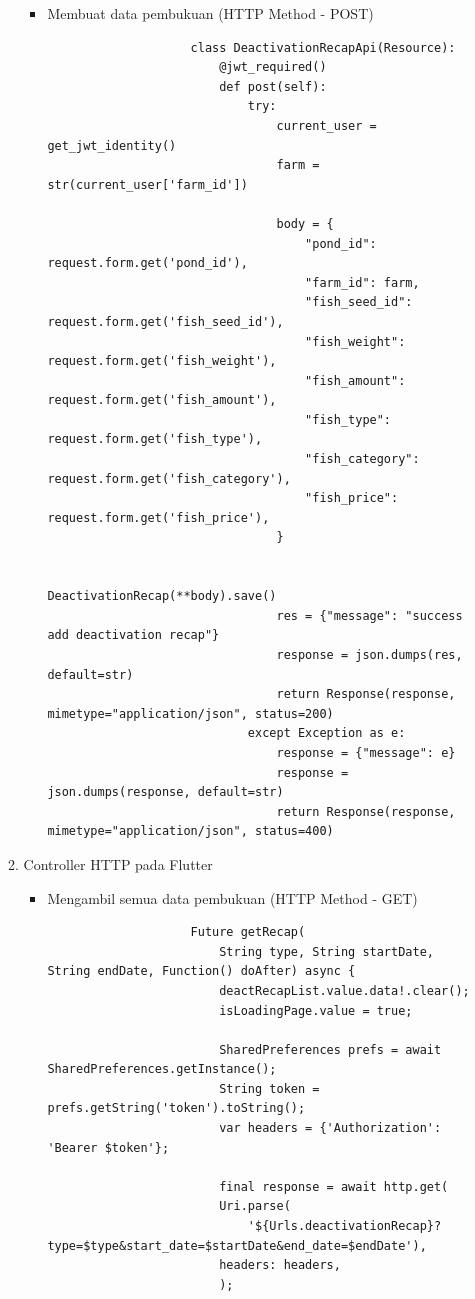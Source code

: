 \begin{spacing}{1.5}
\begin{enumerate}
\begin{enumerate}
\begin{itemize}
\begin{lstlisting}
				\end{lstlisting}

				\item Membuat data pembukuan (HTTP Method - POST)
				
				\begin{lstlisting}
					class DeactivationRecapApi(Resource):
						@jwt_required()
						def post(self):
							try:
								current_user = get_jwt_identity()
								farm = str(current_user['farm_id'])
					
								body = {
									"pond_id": request.form.get('pond_id'),
									"farm_id": farm,
									"fish_seed_id": request.form.get('fish_seed_id'),
									"fish_weight": request.form.get('fish_weight'),
									"fish_amount": request.form.get('fish_amount'),
									"fish_type": request.form.get('fish_type'),
									"fish_category": request.form.get('fish_category'),
									"fish_price": request.form.get('fish_price'),
								}
					
								DeactivationRecap(**body).save()
								res = {"message": "success add deactivation recap"}
								response = json.dumps(res, default=str)
								return Response(response, mimetype="application/json", status=200)
							except Exception as e:
								response = {"message": e}
								response = json.dumps(response, default=str)
								return Response(response, mimetype="application/json", status=400)
				\end{lstlisting}
			\end{itemize}
			
			\item Controller HTTP pada Flutter

			\begin{itemize}
				\item Mengambil semua data pembukuan (HTTP Method - GET)
				
				\begin{lstlisting}
					Future getRecap(
						String type, String startDate, String endDate, Function() doAfter) async {
						deactRecapList.value.data!.clear();
						isLoadingPage.value = true;

						SharedPreferences prefs = await SharedPreferences.getInstance();
						String token = prefs.getString('token').toString();
						var headers = {'Authorization': 'Bearer $token'};

						final response = await http.get(
						Uri.parse(
							'${Urls.deactivationRecap}?type=$type&start_date=$startDate&end_date=$endDate'),
						headers: headers,
						);


\end{lstlisting}
\end{itemize}
\end{enumerate}
\end{enumerate}
\end{spacing}
